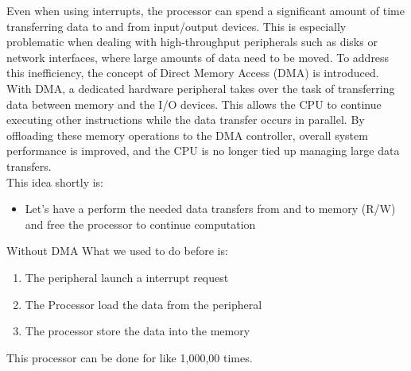 Even when using interrupts, the processor can spend a significant amount of time transferring data to and from input/output devices. This is especially problematic when dealing with high-throughput peripherals such as disks or network interfaces, where large amounts of data need to be moved. To address this inefficiency, the concept of Direct Memory Access (DMA) is introduced. With DMA, a dedicated hardware peripheral takes over the task of transferring data between memory and the I/O devices. This allows the CPU to continue executing other instructions while the data transfer occurs in parallel. By offloading these memory operations to the DMA controller, overall system performance is improved, and the CPU is no longer tied up managing large data transfers.\\
This idea shortly is:
\begin{itemize}
	\item Let’s have a  perform the needed data transfers from and to memory (R/W) and free the processor to continue computation
\end{itemize}
\begin{parag}{Without DMA}
    What we used to do before is:
	\begin{enumerate}
	    \item The peripheral launch a interrupt request
	    \item The Processor load the data from the peripheral
	    \item The processor store the data into the memory
	\end{enumerate}
	This processor can be done for like 1,000,00 times.
\end{parag}
